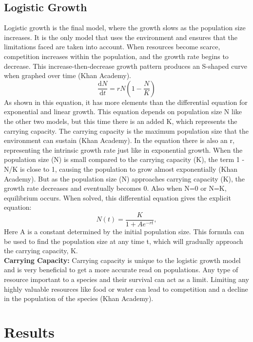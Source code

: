 \documentclass{article}
\begin{document}
\subsection{Logistic Growth}
Logistic growth is the final model, where the growth slows as the population size increases. It is the only model that uses the environment and ensures that the limitations faced are taken into account. When resources become scarce, competition increases within the population, and the growth rate begins to decrease. This increase-then-decrease growth pattern produces an S-shaped curve when graphed over time (Khan Academy).
\begin{equation}
\frac{\mathrm{d}N}{\mathrm{d}t} = rN\left(1 - \frac{N}{K}\right)
\end{equation}
As shown in this equation, it has more elements than the differential equation for exponential and linear growth. This equation depends on population size N like the other two models, but this time there is an added K, which represents the carrying capacity. The carrying capacity is the maximum population size that the environment can sustain (Khan Academy). In the equation there is also an r, representing the intrinsic growth rate just like in exponential growth. When the population size (N) is small compared to the carrying capacity (K), the term 1 - N/K is close to 1, causing the population to grow almost exponentially (Khan Academy).  But as the population size (N) approaches carrying capacity (K), the growth rate decreases and eventually becomes 0. Also when N=0 or N=K, equilibrium occurs.
When solved, this differential equation gives the explicit equation: 
\begin{equation}
N(t) = \frac{K}{1 + Ae^{-rt}},
\end{equation}
Here A is a constant determined by the initial population size. This formula can be used to find the population size at any time t, which will gradually approach the carrying capacity, K.
\\
\textbf{Carrying Capacity:}
Carrying capacity is unique to the logistic growth model and is very beneficial to get a more accurate read on populations. Any type of resource important to a species and their survival can act as a limit. Limiting any highly valuable resources like food or water can lead to competition and a decline in the population of the species (Khan Academy).

\section{Results}
\end{document}
